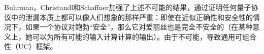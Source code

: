 Buhrman，Christandl和Schaffner\cite{Salvail2015}加强了上述不可能的结果，通过证明任何量子协议中的泄漏本质上都可以像人们想象的那样严重：即使在近似正确性和安全性的情况下，如果一个协议对鲍勃“安全”，那么它对爱丽丝也是完全不安全的（在某种意义上，她可以为所有可能的输入计算计算的输出）。由于不可能，导致通用可组合性（UC）框架。

